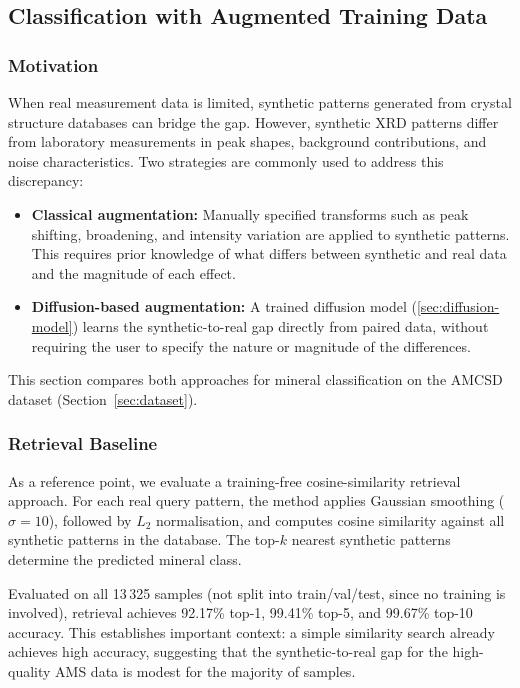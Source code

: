 \subsection{Classification with Augmented Training Data}

\subsubsection{Motivation}

When real measurement data is limited, synthetic patterns generated from crystal structure databases can bridge the gap.
However, synthetic XRD patterns differ from laboratory measurements in peak shapes, background contributions, and noise characteristics.
Two strategies are commonly used to address this discrepancy:

\begin{itemize}
    \item \textbf{Classical augmentation:} Manually specified transforms such as peak shifting, broadening, and intensity variation are applied to synthetic patterns. This requires prior knowledge of what differs between synthetic and real data and the magnitude of each effect.
    \item \textbf{Diffusion-based augmentation:} A trained diffusion model (\ref{sec:diffusion-model}) learns the synthetic-to-real gap directly from paired data, without requiring the user to specify the nature or magnitude of the differences.
\end{itemize}

This section compares both approaches for mineral classification on the AMCSD dataset (Section~\ref{sec:dataset}).


\subsubsection{Retrieval Baseline}

As a reference point, we evaluate a training-free cosine-similarity retrieval approach.
For each real query pattern, the method applies Gaussian smoothing ($\sigma{=}10$), followed by $L_2$ normalisation, and computes cosine similarity against all synthetic patterns in the database.
The top-$k$ nearest synthetic patterns determine the predicted mineral class.

Evaluated on all 13\,325 samples (not split into train/val/test, since no training is involved), retrieval achieves 92.17\% top-1, 99.41\% top-5, and 99.67\% top-10 accuracy.
This establishes important context: a simple similarity search already achieves high accuracy, suggesting that the synthetic-to-real gap for the high-quality AMS data is modest for the majority of samples.


